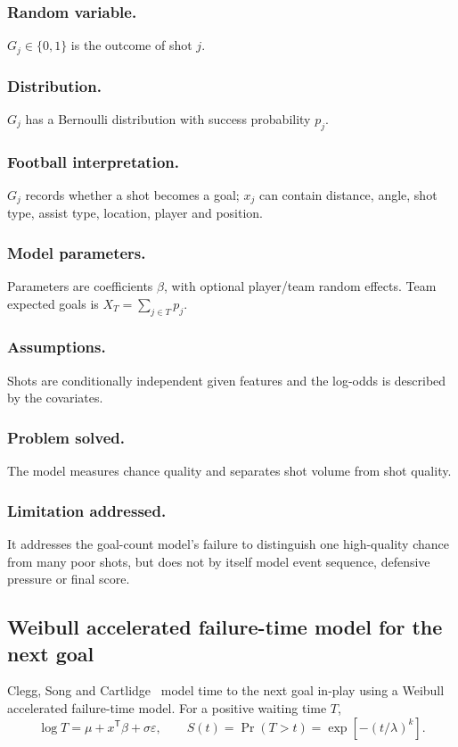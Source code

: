 \documentclass[11pt,a4paper]{amsart}
\numberwithin{equation}{section}
\begin{document}
\subsubsection*{Random variable.} $G_j\in\{0,1\}$ is the outcome of shot $j$.
\subsubsection*{Distribution.} $G_j$ has a Bernoulli distribution with success probability $p_j$.
\subsubsection*{Football interpretation.} $G_j$ records whether a shot becomes a goal; $x_j$ can contain distance, angle, shot type, assist type, location, player and position.
\subsubsection*{Model parameters.} Parameters are coefficients $\beta$, with optional player/team random effects. Team expected goals is $X_T=\sum_{j\in T}p_j$.
\subsubsection*{Assumptions.} Shots are conditionally independent given features and the log-odds is described by the covariates.
\subsubsection*{Problem solved.} The model measures chance quality and separates shot volume from shot quality.
\subsubsection*{Limitation addressed.} It addresses the goal-count model's failure to distinguish one high-quality chance from many poor shots, but does not by itself model event sequence, defensive pressure or final score.

\subsection{Weibull accelerated failure-time model for the next goal}
Clegg, Song and Cartlidge~\cite{clegg2026} model time to the next goal in-play using a Weibull accelerated failure-time model. For a positive waiting time $T$,
\begin{equation}\log T=\mu+x^{\mathsf T}\beta+\sigma\varepsilon,\qquad S(t)=\Pr(T>t)=\exp[-(t/\lambda)^k].\end{equation}
\end{document}

